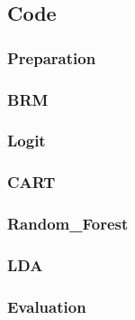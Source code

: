 \documentclass{article}
\begin{document}
\subsection{Code}
\subsubsection{Preparation}

\subsubsection{BRM}


\subsubsection{Logit}

\subsubsection{CART}

\subsubsection{Random\_Forest}

\subsubsection{LDA}


\subsubsection{Evaluation}

\end{document}

